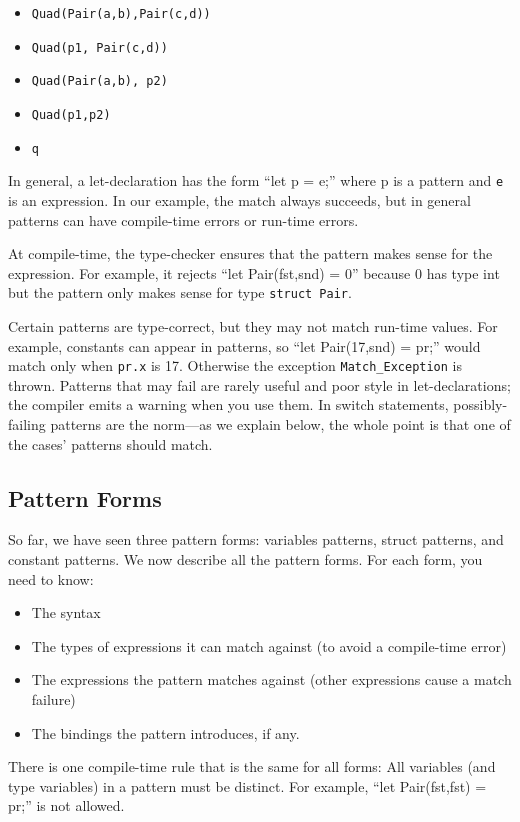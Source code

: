 \begin{itemize}
\item \texttt{Quad(Pair(a,b),Pair(c,d))}
\item \texttt{Quad(p1, Pair(c,d))}
\item \texttt{Quad(Pair(a,b), p2)}
\item \texttt{Quad(p1,p2)}
\item \texttt{q}
\end{itemize}

In general, a let-declaration has the form ``let p = e;'' where p is a
pattern and \texttt{e} is an expression.  In our example, the match
always succeeds, but in general patterns can have compile-time errors
or run-time errors.

At compile-time, the type-checker ensures that the pattern makes sense
for the expression.  For example, it rejects ``let Pair(fst,snd) = 0''
because 0 has type int but the pattern only makes sense for type
\texttt{struct Pair}.

Certain patterns are type-correct, but they may not match run-time
values.  For example, constants can appear in patterns, so ``let
Pair(17,snd) = pr;'' would match only when \texttt{pr.x} is 17.
Otherwise the exception \texttt{Match_Exception} is thrown.  Patterns
that may fail are rarely useful and poor style in let-declarations;
the compiler emits a warning when you use them.  In switch statements,
possibly-failing patterns are the norm---as we explain below, the
whole point is that one of the cases' patterns should match.

\subsection{Pattern Forms}\hypertarget{pat_forms}{}

So far, we have seen three pattern forms: variables patterns, struct
patterns, and constant patterns.  We now describe all the pattern
forms.  For each form, you need to know:

\begin{itemize}
\item The syntax
\item The types of expressions it can match against (to avoid a
  compile-time error)
\item The expressions the pattern matches against (other expressions
  cause a match failure)
\item The bindings the pattern introduces, if any.
\end{itemize}
There is one compile-time rule that is the same for all forms: All
variables (and type variables) in a pattern must be distinct.  For
example, ``let Pair(fst,fst) = pr;'' is not allowed.

